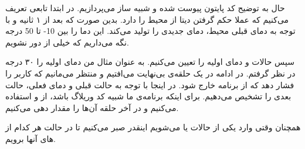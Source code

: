 \documentclass[]{article}
\begin{document}
حال به توضیح کد پایتون پیوست شده و شبیه ساز می‌پردازیم. در ابتدا تابعی تعریف می‌کنیم که عملا حکم
گرفتن دیتا از محیط را دارد. بدین صورت که بعد از ۱ ثانیه و با توجه به دمای قبلی محیط، دمای جدیدی را
تولید می‌کند. این دما را بین
10- تا 50 درجه نگه می‌داریم
که خیلی از
دور نشویم.

سپس حالات و دمای اولیه را تعیین می‌کنیم. به عنوان مثال من دمای اولیه را ۳۰ درجه در نظر گرفتم. در ادامه در یک
حلقه‌ی بی‌نهایت می‌افتیم و منتظر می‌مانیم که کاربر
را فشار دهد که از برنامه خارج شود. در اینجا با توجه به حالت قبلی و دمای فعلی، حالت بعدی را
تشخیص می‌دهیم. برای اینکه برنامه‌ی ما شبیه کد وریلاگ باشد، از
 و 
استفاده می‌کنیم و در آخر حلقه آن‌ها را مقدار دهی می‌کنیم.

همچنان وقتی وارد یکی از حالات
 یا 
می‌شویم اینقدر صبر می‌کنیم تا در حالت
هر کدام از
های
آنها برویم.
\end{document}
